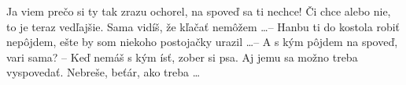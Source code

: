 Ja viem prečo si ty tak zrazu ochorel, na spoveď sa ti nechce! Či chce alebo
nie, to je teraz vedľajšie. Sama vidíš, že kľačať nemôžem \dots -- Hanbu ti
do kostola robiť nepôjdem, ešte by som niekoho postojačky urazil \dots -- A
s kým pôjdem na spoveď, vari sama? -- Keď nemáš s kým ísť, zober si psa. Aj
jemu sa možno treba vyspovedať. Nebreše, beťár, ako treba \dots
